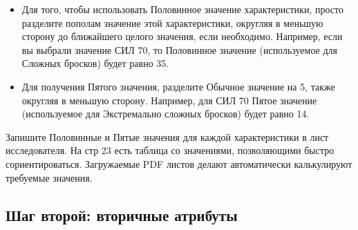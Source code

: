 \documentclass[letterpaper,twocolumn,openany, twoside, 8pt, usenames]{cocbook}
\begin{document}
\begin{itemize}[leftmargin=4mm]
  \item Для того, чтобы использовать Половинное значение характеристики, просто разделите пополам значение этой характеристики, округляя в меньшую сторону до ближайшего целого значения, если необходимо. Например, если вы выбрали значение СИЛ 70, то Половинное значение (используемое для Сложных бросков) будет равно 35.
  \item Для получения Пятого значения, разделите Обычное значение на 5, также округляя в меньшую сторону. Например, для СИЛ 70 Пятое значение (используемое для Экстремально сложных бросков) будет равно 14.
\end{itemize}

Запишите Половинные и Пятые значения для каждой характеристики в лист исследователя. На стр 23 есть таблица со значениями, позволяющими быстро сориентироваться. Загружаемые PDF листов делают автоматически калькулируют требуемые значения.

\subsection*{Шаг второй: вторичные атрибуты}
\end{document}
